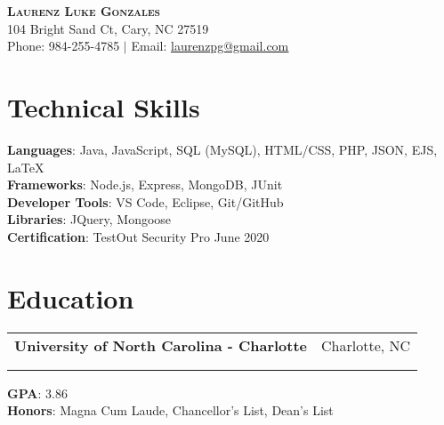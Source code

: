 \documentclass[letterpaper,10pt]{article}
\makeatletter
\newcommand{\resumeEdu}[6]{
  \vspace{-2pt}\item
    \begin{tabular*}{0.97\textwidth}[t]{l@{\extracolsep{\fill}}r}
      \textbf{#1} & #2 \\
      \text{\small#3} & \text{\small#4} \\
      \text{\small#5} & \text{\small#6} \\
    \end{tabular*}\vspace{-7pt}
}
\newcommand{\resumeSubHeadingListStart}{\begin{itemize}[leftmargin=0.15in, label={}]}
\newcommand{\resumeSubHeadingListEnd}{\end{itemize}}
\makeatother
\begin{document}

\begin{center}
    \textbf{\Huge \scshape Laurenz Luke Gonzales} \\ \vspace{1pt}
    104 Bright Sand Ct, Cary, NC 27519 \\
    \small Phone: 984-255-4785 $|$ {Email: }\href{mailto:laurenzpg@gmail.com}{\underline{laurenzpg@gmail.com}}
\end{center}

\section{Technical Skills}
 \begin{itemize}[leftmargin=0.15in, label={}]
    \small{\item{
     \textbf{Languages}{: Java, JavaScript, SQL (MySQL), HTML/CSS, PHP, JSON, EJS, LaTeX} \\
     \textbf{Frameworks}{: Node.js, Express, MongoDB, JUnit} \\
     \textbf{Developer Tools}{: VS Code, Eclipse, Git/GitHub} \\
     \textbf{Libraries}{: JQuery, Mongoose} \\
     \textbf{Certification}{: TestOut Security Pro \hfill{June 2020}} \\
    }}
 \end{itemize}

\section{Education}
  \resumeSubHeadingListStart
    \resumeEdu
      {University of North Carolina - Charlotte}{Charlotte, NC}
      {Bachelor of Science (BS) in Computer Science, Software Engineering}{Graduation Date: May 2022}
      {Bachelor of Arts (BA) in Japanese Studies}{Graduation Date: May 2022}
    \small{\item{
      \textbf{GPA}{: 3.86} \\
      \textbf{Honors}{: Magna Cum Laude, Chancellor's List, Dean's List} \\
      }}
  \resumeSubHeadingListEnd
\end{document}
